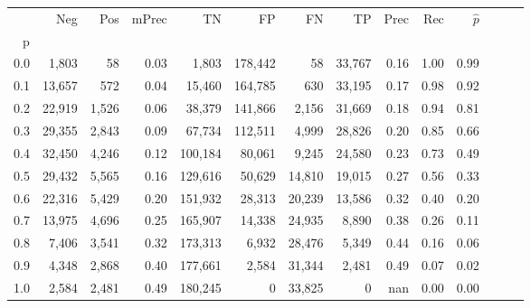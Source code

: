 \begin{tabular}{rrrrrrrrrrrrrr}
\toprule
{} &     Neg &    Pos & mPrec &       TN &       FP &      FN &      TP &  Prec &   Rec & $\hat{p}$ \\
p   &         &        &       &          &          &         &         &       &       &           \\
\midrule
0.0 &   1,803 &     58 &  0.03 &    1,803 &  178,442 &      58 &  33,767 &  0.16 &  1.00 &      0.99 \\
0.1 &  13,657 &    572 &  0.04 &   15,460 &  164,785 &     630 &  33,195 &  0.17 &  0.98 &      0.92 \\
0.2 &  22,919 &  1,526 &  0.06 &   38,379 &  141,866 &   2,156 &  31,669 &  0.18 &  0.94 &      0.81 \\
0.3 &  29,355 &  2,843 &  0.09 &   67,734 &  112,511 &   4,999 &  28,826 &  0.20 &  0.85 &      0.66 \\
0.4 &  32,450 &  4,246 &  0.12 &  100,184 &   80,061 &   9,245 &  24,580 &  0.23 &  0.73 &      0.49 \\
0.5 &  29,432 &  5,565 &  0.16 &  129,616 &   50,629 &  14,810 &  19,015 &  0.27 &  0.56 &      0.33 \\
0.6 &  22,316 &  5,429 &  0.20 &  151,932 &   28,313 &  20,239 &  13,586 &  0.32 &  0.40 &      0.20 \\
0.7 &  13,975 &  4,696 &  0.25 &  165,907 &   14,338 &  24,935 &   8,890 &  0.38 &  0.26 &      0.11 \\
0.8 &   7,406 &  3,541 &  0.32 &  173,313 &    6,932 &  28,476 &   5,349 &  0.44 &  0.16 &      0.06 \\
0.9 &   4,348 &  2,868 &  0.40 &  177,661 &    2,584 &  31,344 &   2,481 &  0.49 &  0.07 &      0.02 \\
1.0 &   2,584 &  2,481 &  0.49 &  180,245 &        0 &  33,825 &       0 &   nan &  0.00 &      0.00 \\
\bottomrule
\end{tabular}
